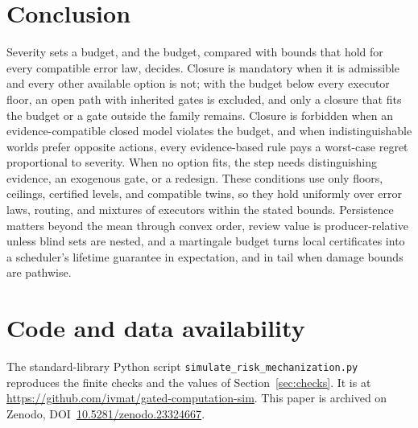 \documentclass[11pt]{article}
\theoremstyle{definition}
\theoremstyle{remark}
\begin{document}
\section{Conclusion}
Severity sets a budget, and the budget, compared with bounds that hold for every compatible error law,
decides. Closure is mandatory when it is admissible and every other available option is not; with the
budget below every executor floor, an open path with inherited gates is excluded, and only a closure
that fits the budget or a gate outside the family remains. Closure is forbidden when an evidence-compatible closed model violates the budget, and when
indistinguishable worlds prefer opposite actions, every evidence-based rule pays a worst-case regret
proportional to severity. When no option fits, the step needs distinguishing evidence, an exogenous
gate, or a redesign. These conditions use only floors, ceilings, certified levels, and compatible twins,
so they hold uniformly over error laws, routing, and mixtures of executors within the stated bounds.
Persistence matters beyond the mean through convex order, review value is producer-relative unless
blind sets are nested, and a martingale budget turns local certificates into a scheduler's lifetime
guarantee in expectation, and in tail when damage bounds are pathwise.

\section*{Code and data availability}
The standard-library Python script \texttt{simulate\_risk\_mechanization.py} reproduces the finite checks and the
values of Section~\ref{sec:checks}. It is at \url{https://github.com/ivmat/gated-computation-sim}.
This paper is archived on Zenodo, DOI~\href{https://doi.org/10.5281/zenodo.23324667}{10.5281/zenodo.23324667}.
\end{document}
